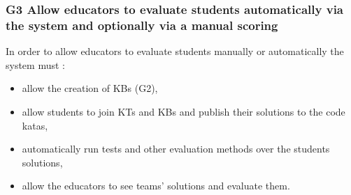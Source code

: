 \documentclass[11pt]{report}
\begin{document}
\subsubsection{G3 Allow educators to evaluate students automatically via the system and optionally via a manual scoring}
In order to allow educators to evaluate students manually or automatically the system must :
\begin{itemize}
    \item allow the creation of KBs (G2),
    \item allow students to join KTs and KBs and publish their solutions to the code katas,
    \item automatically run tests and other evaluation methods over the students solutions,
    \item allow the educators to see teams' solutions and evaluate them.
\end{itemize}
\end{document}
